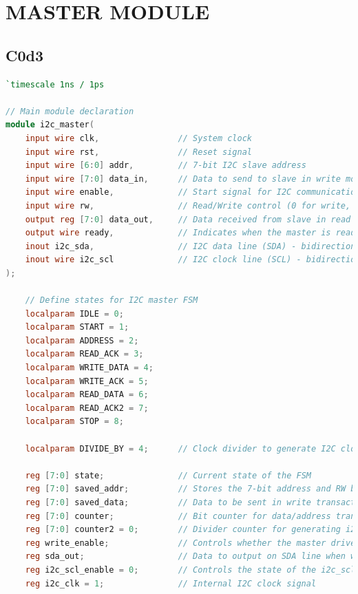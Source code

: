\documentclass[a4paper,12pt]{report}
\begin{document}
\section{MASTER MODULE}
\subsection{C0d3}

\begin{lstlisting}[language=Verilog, caption={I2C Master Module in Verilog}, label=lst:i2c_master]
`timescale 1ns / 1ps

// Main module declaration
module i2c_master(
    input wire clk,                // System clock
    input wire rst,                // Reset signal
    input wire [6:0] addr,         // 7-bit I2C slave address
    input wire [7:0] data_in,      // Data to send to slave in write mode
    input wire enable,             // Start signal for I2C communication
    input wire rw,                 // Read/Write control (0 for write, 1 for read)
    output reg [7:0] data_out,     // Data received from slave in read mode
    output wire ready,             // Indicates when the master is ready for a new transaction
    inout i2c_sda,                 // I2C data line (SDA) - bidirectional
    inout wire i2c_scl             // I2C clock line (SCL) - bidirectional
);

    // Define states for I2C master FSM
    localparam IDLE = 0;
    localparam START = 1;
    localparam ADDRESS = 2;
    localparam READ_ACK = 3;
    localparam WRITE_DATA = 4;
    localparam WRITE_ACK = 5;
    localparam READ_DATA = 6;
    localparam READ_ACK2 = 7;
    localparam STOP = 8;

    localparam DIVIDE_BY = 4;      // Clock divider to generate I2C clock from system clock

    reg [7:0] state;               // Current state of the FSM
    reg [7:0] saved_addr;          // Stores the 7-bit address and RW bit for the current transaction
    reg [7:0] saved_data;          // Data to be sent in write transactions
    reg [7:0] counter;             // Bit counter for data/address transmission
    reg [7:0] counter2 = 0;        // Divider counter for generating i2c_clk
    reg write_enable;              // Controls whether the master drives SDA line
    reg sda_out;                   // Data to output on SDA line when write_enable is 1
    reg i2c_scl_enable = 0;        // Controls the state of the i2c_scl line (enabled or high)
    reg i2c_clk = 1;               // Internal I2C clock signal


\end{lstlisting}
\end{document}
